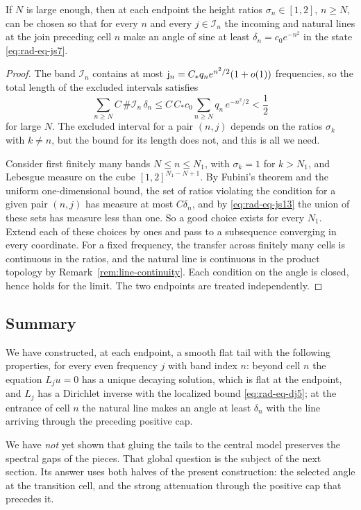 \begin{lemma}
\label{lem:radial-product-selection}
If $N$ is large enough, then at each endpoint the height ratios
$\sigma_n\in[1,2]$, $n\ge N$, can be chosen so that for every $n$ and
every $j\in\mathcal I_n$ the incoming and natural lines at the join
preceding cell $n$ make an angle of sine at least
$\delta_n=c_0e^{-n^2}$ in the state \eqref{eq:rad-eq-js7}.
\end{lemma}

\begin{proof}
The band $\mathcal I_n$ contains at most
$\mathsf j_n=C_*q_ne^{n^2/2}(1+o(1))$ frequencies, so the total length of
the excluded intervals satisfies
\begin{equation}\label{eq:rad-eq-js13}
 \sum_{n\ge N}C\,\#\mathcal I_n\,\delta_n
 \le C\,C_*c_0\sum_{n\ge N}q_n\,e^{-n^2/2}<\frac12
\end{equation}
for large $N$. The excluded interval for a pair $(n,j)$ depends on
the ratios $\sigma_k$ with $k\ne n$, but the bound for its length does
not, and this is all we need.

Consider first finitely many bands $N\le n\le N_1$, with
$\sigma_k=1$ for $k>N_1$, and Lebesgue measure on the cube
$[1,2]^{N_1-N+1}$. By Fubini's theorem and the uniform
one-dimensional bound, the set of ratios violating the condition for a
given pair $(n,j)$ has measure at most $C\delta_n$, and by
\eqref{eq:rad-eq-js13} the union of these sets has measure less than
one. So a good choice exists for every $N_1$. Extend each of these
choices by ones and pass to a subsequence converging in every
coordinate. For a fixed frequency, the transfer across finitely many
cells is continuous in the ratios, and the natural line is continuous
in the product topology by Remark~\ref{rem:line-continuity}. Each
condition on the angle is closed, hence holds for the limit. The two
endpoints are treated independently.
\end{proof}

\subsection{Summary}

We have constructed, at each endpoint, a smooth flat tail with the
following properties, for every even frequency $j$ with band index
$n$: beyond cell $n$ the equation $L_ju=0$ has a unique decaying
solution, which is flat at the endpoint, and $L_j$ has a Dirichlet
inverse with the localized bound \eqref{eq:rad-eq-dj5}; at the
entrance of cell $n$ the natural line makes an angle at least
$\delta_n$ with the line arriving through the preceding positive cap.

We have \emph{not} yet shown that gluing the tails to the central
model preserves the spectral gaps of the pieces. That global question
is the subject of the next section. Its answer uses both halves of the
present construction: the selected angle at the transition cell, and
the strong attenuation through the positive cap that precedes it.
